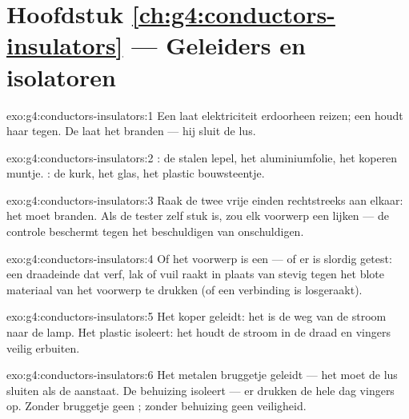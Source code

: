 \section*{Hoofdstuk \ref{ch:g4:conductors-insulators} --- Geleiders en isolatoren}

\begin{solution}{exo:g4:conductors-insulators:1}
Een  laat elektriciteit erdoorheen reizen; een
 houdt haar tegen. De  laat het  branden ---
hij sluit de lus.
\end{solution}

\begin{solution}{exo:g4:conductors-insulators:2}
: de stalen lepel, het aluminiumfolie, het koperen muntje.
: de kurk, het glas, het plastic bouwsteentje.
\end{solution}

\begin{solution}{exo:g4:conductors-insulators:3}
Raak de twee vrije einden rechtstreeks aan elkaar: het  moet
branden. Als de tester zelf stuk is, zou elk voorwerp een
 lijken --- de controle beschermt tegen het beschuldigen van
onschuldigen.
\end{solution}

\begin{solution}{exo:g4:conductors-insulators:4}
Of het voorwerp is een  --- of er is slordig getest: een
draadeinde dat verf, lak of vuil raakt in plaats van stevig tegen het
blote materiaal van het voorwerp te drukken (of een verbinding is
losgeraakt).
\end{solution}

\begin{solution}{exo:g4:conductors-insulators:5}
Het koper geleidt: het is de weg van de stroom naar de lamp. Het
plastic isoleert: het houdt de stroom in de draad en vingers veilig
erbuiten.
\end{solution}

\begin{solution}{exo:g4:conductors-insulators:6}
Het metalen bruggetje geleidt --- het moet de lus sluiten als de
 aanstaat. De behuizing isoleert --- er drukken de hele dag
vingers op. Zonder bruggetje geen ; zonder behuizing geen
veiligheid.
\end{solution}

